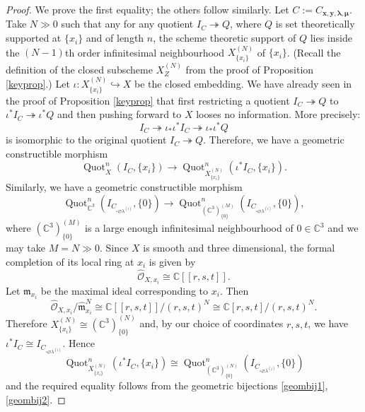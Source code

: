 \documentclass[12pt]{amsart}
\theoremstyle{definition}
\newcommand{\CC} {\mathbb{C}}          %
\renewcommand{\O}{\mathcal{O}}
\newcommand{\Quot}{\operatorname{Quot}}
\newcommand{\boldx}{\boldsymbol{x}}
\newcommand{\boldy}{\boldsymbol{y}}
\newcommand{\boldlambda}{\boldsymbol{\lambda }}
\newcommand{\boldmu}{\boldsymbol{\mu }}
\renewcommand{\emptyset}{\varnothing}
\newcommand{\bx}{\square}
\begin{document}
\begin{proof}
We prove the first equality; the others follow similarly. Let $C:=C_{\boldx, \boldy, \boldlambda, \boldmu}$. Take $N \gg 0$ such that any for any quotient $I_C \twoheadrightarrow Q$, where $Q$ is set theoretically supported at $\{x_i\}$ and of length $n$, the scheme theoretic support of $Q$ lies inside the $(N-1)$th order infinitesimal neighbourhood $X_{\{x_i\}}^{(N)}$ of $\{x_i\}$. (Recall the definition of the closed subscheme $X_{Z}^{(N)}$ from the proof of Proposition \ref{keyprop}.) Let $\iota : X_{\{x_i\}}^{(N)} \hookrightarrow X$ be the closed embedding. We have already seen in the proof of Proposition \ref{keyprop} that first restricting a quotient $I_C \twoheadrightarrow Q$ to $\iota^* I_C \twoheadrightarrow \iota^*Q$ and then pushing forward to $X$ looses no information. More precisely:
$$
I_C \twoheadrightarrow \iota_* \iota^* I_C \twoheadrightarrow \iota_* \iota^*Q
$$
is isomorphic to the original quotient $I_C \twoheadrightarrow Q$. Therefore, we have a geometric constructible morphism
\begin{equation} \label{geombij1}
\Quot^{n}_X\left( I_{C}, \{x_i\} \right) \rightarrow \Quot^{n}_{X_{\{x_i\}}^{(N)}}\left( \iota^* I_{C}, \{x_i\} \right). 
\end{equation}
Similarly, we have a geometric constructible morphism
\begin{equation} \label{geombij2}
\Quot^{n}_{\CC^3}\left( I_{C_{\bx \emptyset \lambda^{(i)}}},  \{0\} \right) \rightarrow \Quot^{n}_{(\CC^3)_{\{0\}}^{(M)}}\left( I_{C_{\bx \emptyset \lambda^{(i)}}},  \{0\} \right),
\end{equation}
where $(\CC^3)_{\{0\}}^{(M)}$ is a large enough infinitesimal neighbourhood of $0 \in \CC^3$ and we may take $M=N \gg 0$. Since $X$ is smooth and three dimensional, the formal completion of its local ring at $x_i$ is given by
$$
\widehat{\O}_{X,x_i} \cong \CC[[r,s,t]].
$$ 
Let $\mathfrak{m}_{x_i}$ be the maximal ideal corresponding to $x_i$. Then \cite[Cor.~10.4]{Atiyah-Macdonald}
$$
\widehat{\O}_{X,x_i} / \widehat{\mathfrak{m}}_{x_i}^N \cong \CC[[r,s,t]] / (r,s,t)^N \cong \CC[r,s,t] / (r,s,t)^N.
$$
Therefore $X_{\{x_i\}}^{(N)} \cong (\CC^3)_{\{0\}}^{(N)}$ and, by our choice of coordinates $r,s,t$, we have $\iota^* I_C \cong I_{C_{\bx \emptyset \lambda^{(i)}}}$. Hence
$$
\Quot^{n}_{X_{\{x_i\}}^{(N)}}\left( \iota^* I_{C}, \{x_i\} \right) \cong \Quot^{n}_{(\CC^3)_{\{0\}}^{(N)}}\left( I_{C_{\bx \emptyset \lambda^{(i)}}},  \{0\} \right)
$$
and the required equality follows from the geometric bijections \eqref{geombij1}, \eqref{geombij2}.
\end{proof}
\end{document}
